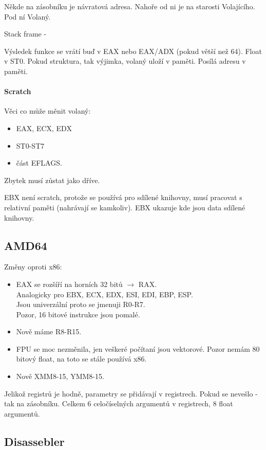 Někde na zásobníku je návratová adresa.
Nahoře od ni je na starosti Volajícího. Pod ní Volaný.

\begin{definition}
	Stack frame -
\end{definition}

Výsledek funkce se vrátí buď v EAX nebo EAX/ADX (pokud větší než 64).
Float v ST0.
Pokud struktura, tak výjimka, volaný uloží v paměti. Posílá adresu v paměti.

\paragraph{Scratch} Věci co může měnit volaný:
\begin{itemize}
	\item EAX, ECX, EDX
	\item ST0-ST7
	\item část EFLAGS.
\end{itemize}

Zbytek musí zůstat jako dříve.

EBX není scratch, protože se používá pro sdílené knihovny, musí pracovat s relativní paměti (nahrávají se kamkoliv).
EBX ukazuje kde jsou data sdílené knihovny.

\subsection{AMD64}
Změny oproti x86:
\begin{itemize}
	\item EAX se rozšíří na horních 32 bitů $\to$ RAX.\\
		Analogicky pro EBX, ECX, EDX, ESI, EDI, EBP, ESP.\\
		Jsou univerzální proto se jmenuji R0-R7.\\
		Pozor, 16 bitové instrukce jsou pomalé.
	\item Nově máme R8-R15.
	\item FPU se moc nezměnila, jen veškeré počítaní jsou vektorové.
		Pozor nemám 80 bitový float, na toto se stále používá x86.
	\item Nově XMM8-15, YMM8-15.
\end{itemize}

Jelikož registrů je hodně, parametry se přidávají v registrech.
Pokud se nevešlo - tak na zásobníku.
Celkem 6 celočíselných argumentů v registrech, 8 float argumentů.


\subsection{Disassebler}

